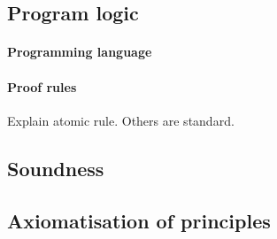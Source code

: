 %	



\subsection{Program logic}

\paragraph{Programming language}

\paragraph{Proof rules}
Explain atomic rule. Others are standard.



\subsection{Soundness}
\label{sec:soundness}


\subsection{Axiomatisation of \colosl principles}

